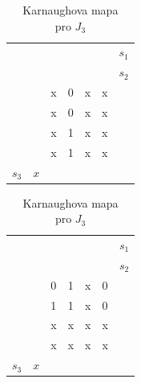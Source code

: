 \newpage 
\begin{table}[!h]
\begin{minipage}{.5\linewidth}
      \caption{Karnaughova mapa\\ pro $K_2$}
      \centering
    \begin{tabular}{lllllll}
      			       &       					 &       				 &  &	\colorbox{yellow}{}& \colorbox{yellow}{}        &$s_1$ \\
    		 	       &        					&       & \colorbox{red}{}    & 	\colorbox{red}{} 			      &         &$s_2$     \\
    		 	       &        					& x   				 & 0    				   & x     				& x       &  \\
              	       & \colorbox{black}{}       & x     				 & 0    				   & x   		  			& x       &  \\
\colorbox{blue}{}& \colorbox{black}{}       & x    				 & 1     				   & x     				& x       &  \\
\colorbox{blue}{}&       					 & x   				 & 1				  	   & x    					& x       &  \\
    	  $ s_3$ 	& $x$  					&     				 &       				   &       				  	 &          &  \\
    \end{tabular}%
  \end{minipage}%
    \begin{minipage}{.5\linewidth}
      \centering
        \caption{Karnaughova mapa\\ pro $J_3$}
    \begin{tabular}{lllllll}
      			       &       					 &       				 &  &	\colorbox{yellow}{}&   \colorbox{yellow}{}     &$s_1$ \\
    		 	       &        					&       & \colorbox{red}{}    & 		\colorbox{red}{} 		      &         &$s_2$     \\
    		 	       &        					& 0    				 & 1    				   & x     				& 0       &  \\
              	       & \colorbox{black}{}       & 1     				 & 1    				   & x   		  			& 0       &  \\
\colorbox{blue}{}& \colorbox{black}{}       & x    				 & x     				   & x     				& x       &  \\
\colorbox{blue}{}&       					 & x   				 & x				  	   & x    					& x       &  \\
    	  $ s_3$ 	& $x$  					&     				 &       				   &       				  	 &          &  \\
    \end{tabular}%
  \end{minipage} 

   
  \label{tab:addlabel}%
\end{table}%

